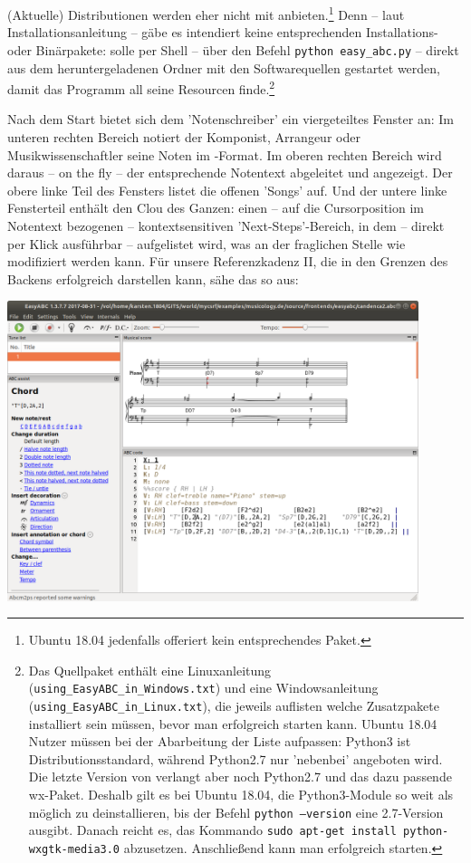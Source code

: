 (Aktuelle) Distributionen werden  eher nicht mit
anbieten.\footnote{Ubuntu 18.04 jedenfalls offeriert kein entsprechendes Paket.}
Denn -- laut  Installationsanleitung -- gäbe es intendiert keine
entsprechenden Installations- oder Binärpakete:  solle per Shell --
über den Befehl \texttt{python easy\_abc.py} -- direkt aus dem heruntergeladenen
Ordner mit den Softwarequellen gestartet werden, damit das Programm all seine
Resourcen finde.\footnote{Das Quellpaket enthält eine Linuxanleitung
(\texttt{using\_EasyABC\_in\_Windows.txt}) und eine Windowsanleitung
(\texttt{using\_EasyABC\_in\_Linux.txt}), die jeweils auflisten welche
Zusatzpakete installiert sein müssen, bevor man  erfolgreich
starten kann. Ubuntu 18.04 Nutzer müssen bei der Abarbeitung der Liste
aufpassen: Python3 ist Distributionsstandard, während Python2.7 nur 'nebenbei'
angeboten wird. Die letzte Version von  verlangt aber noch
Python2.7 und das dazu passende wx-Paket. Deshalb gilt es bei Ubuntu 18.04, die
Python3-Module so weit als möglich zu deinstallieren, bis der Befehl
\texttt{python --version} eine 2.7-Version ausgibt. Danach reicht es, das
Kommando \texttt{sudo apt-get install python-wxgtk-media3.0}
abzusetzen. Anschließend kann man  erfolgreich starten.}

Nach dem Start bietet sich dem 'Notenschreiber' ein viergeteiltes Fenster an: Im
unteren rechten Bereich notiert der Komponist, Arrangeur oder
Musikwissenschaftler seine Noten im -Format. Im oberen rechten Bereich
wird daraus -- on the fly -- der entsprechende Notentext abgeleitet und
angezeigt. Der obere linke Teil des Fensters listet die offenen 'Songs' auf. Und
der untere linke Fensterteil enthält den Clou des Ganzen: einen -- auf die
Cursorposition im Notentext bezogenen -- kontextsensitiven 'Next-Steps'-Bereich,
in dem -- direkt per Klick ausführbar -- aufgelistet wird, was an der fraglichen
Stelle wie modifiziert werden kann. Für unsere Referenzkadenz II, die
 in den Grenzen des Backens erfolgreich darstellen kann, sähe das
so aus:

\begin{center}
\includegraphics[width=0.9\textwidth]{frontends/easyabc/easyabc-cadenca2-300dpi.png}
\end{center}

